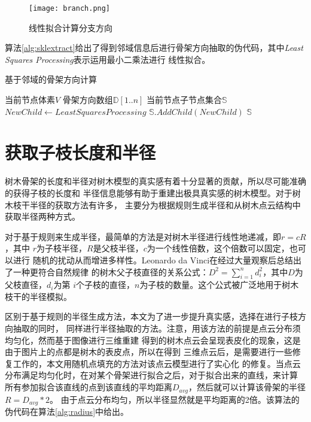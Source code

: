 \begin{figure}[H]
	\centering
	\texttt{[image: branch.png]}
	\caption{线性拟合计算分支方向}
	\label{fig:fitting}
\end{figure}

算法\ref{alg:sklextract}给出了得到邻域信息后进行骨架方向抽取的伪代码，其中\textit{Least Squares Processing}表示运用最小二乘法进行
线性拟合。

\begin{algorithm}[H]
	\caption{基于邻域的骨架方向计算}
	\label{alg:sklextract}
	\begin{algorithmic}[1] 
		\Require 当前节点体素$V$
		\Require 骨架方向数组$\mathbb{D}[1..n]$
		\Ensure 当前节点子节点集合$\mathbb{S}$
			\State $NewChild\gets Least Squares Processing$
			\State $\mathbb{S}.AddChild(NewChild)$
		\EndFor
		\State \Return $\mathbb{S}$
	\end{algorithmic}
\end{algorithm}

\section{获取子枝长度和半径}
树木骨架的长度和半径对树木模型的真实感有着十分显著的贡献，所以尽可能准确的获得子枝的长度和
半径信息能够有助于重建出极具真实感的树木模型。对于树木枝干半径的获取方法有许多，
主要分为根据规则生成半径和从树木点云结构中获取半径两种方式。

对于基于规则来生成半径，最简单的方法是对树木半径进行线性地递减，即$r=cR$，其中
$r$为子枝半径，$R$是父枝半径，$c$为一个线性倍数，这个倍数可以固定，也可以进行
随机的扰动从而增进多样性。Leonardo da Vinci在经过大量观察后总结出了一种更符合自然规律
的树木父子枝直径的关系公式：$D^2=\sum_{i=1}^n{d_i^2}$，其中$D$为父枝直径，$d_i$为第
$i$个子枝的直径，$n$为子枝的数量。这个公式被广泛地用于树木枝干的半径模拟。

区别于基于规则的半径生成方法，本文为了进一步提升真实感，选择在进行子枝方向抽取的同时，
同样进行半径抽取的方法。注意，用该方法的前提是点云分布须均匀化，然而基于图像进行三维重建
得到的树木点云会呈现表皮化的现象，这是由于图片上的点都是树木的表皮点，所以在得到
三维点云后，是需要进行一些修复工作的，本文用随机点填充的方法对该点云模型进行了实心化
的修复。当点云分布满足均匀化时，在对某个骨架进行拟合之后，对于拟合出来的直线，来计算
所有参加拟合该直线的点到该直线的平均距离$D_{avg}$，然后就可以计算该骨架的半径$R=D_{avg}*2$。
由于点云分布均匀，所以半径显然就是平均距离的2倍。该算法的伪代码在算法\ref{alg:radius}中给出。\\

